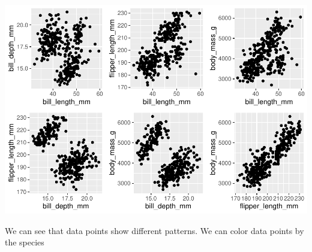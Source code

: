 \documentclass[
]{article}
\begin{document}
\includegraphics{EDA_files/figure-latex/unnamed-chunk-33-1.pdf}

We can see that data points show different patterns. We can color data
points by the species
\end{document}
